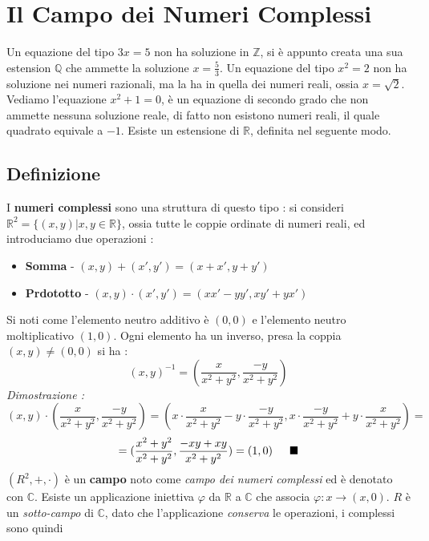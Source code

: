 \documentclass[12pt, letterpaper]{article}
\begin{document}
\section{Il Campo dei Numeri Complessi}
Un equazione del tipo \(3x=5\) non ha soluzione in \(\mathbb{Z}\), si è appunto creata una sua estension \(\mathbb{Q}\)
che ammette la soluzione \(x=\frac{5}{3}\). Un equazione del tipo \(x^2=2\) non ha soluzione nei numeri razionali, ma 
la ha in quella dei numeri reali, ossia \(x=\sqrt{2}\). Vediamo l'equazione \(x^2+1=0\), è un equazione di secondo 
grado che non ammette nessuna soluzione reale, di fatto non esistono numeri reali, il quale quadrato equivale a \(-1\).
Esiste un estensione di \(\mathbb{R}\), definita nel seguente modo. \subsection{Definizione}
I \textbf{numeri complessi} sono una struttura di questo tipo : si consideri \(\mathbb{R}^2=\{(x,y)|x,y \in \mathbb{R}\}\), ossia tutte le coppie ordinate di numeri
reali, ed introduciamo due operazioni : \begin{itemize}
    \item \textbf{Somma} - \((x,y)+(x',y')=(x+x',y+y')\)
    \item \textbf{Prdototto} - \((x,y)\cdot(x',y')=(xx'-yy',xy'+yx')\)
\end{itemize}
Si noti come l'elemento neutro additivo è \((0,0)\) e l'elemento neutro moltiplicativo \((1,0)\). Ogni elemento ha 
un inverso, presa la coppia \((x,y)\ne (0,0)\) si ha :\begin{equation}
    (x,y)^{-1}=(\dfrac{x}{x^2+y^2},\dfrac{-y}{x^2+y^2})
\end{equation}
\textit{Dimostrazione :}\begin{equation}
    (x,y)\cdot(\dfrac{x}{x^2+y^2},\dfrac{-y}{x^2+y^2})=(x\cdot\dfrac{x}{x^2+y^2}-y\cdot\dfrac{-y}{x^2+y^2},x\cdot\dfrac{-y}{x^2+y^2}+y\cdot\dfrac{x}{x^2+y^2})=
\end{equation}\begin{equation}= (\dfrac{x^2+y^2}{x^2+y^2},\dfrac{-xy+xy}{x^2+y^2})=(1,0)\text{\hphantom{aaa}} \blacksquare
\end{equation}
\((R^2,+,\cdot)\) è un \textbf{campo} noto come \textit{campo dei numeri complessi} ed è denotato con \(\mathbb{C}\).
Esiste un applicazione iniettiva \(\varphi\) da \(\mathbb{R}\) a \(\mathbb{C}\) che associa \(\varphi : x\rightarrow(x,0)\). \(R\) è un 
\textit{sotto-campo} di \(\mathbb{C}\), dato che l'applicazione \textit{conserva} le operazioni, i complessi sono quindi 
\end{document}
